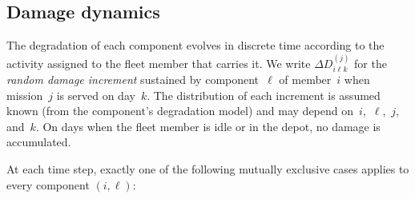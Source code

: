 \documentclass[11pt,a4paper]{article}
\theoremstyle{plain}
\theoremstyle{definition}
\theoremstyle{remark}
\begin{document}
\subsection{Damage dynamics}
\label{sec:damage_dynamics}

The degradation of each component evolves in discrete time according to the activity assigned to the fleet member that carries it.
We write $\Delta D_{i\ell k}^{(j)}$ for the \emph{random damage increment} sustained by component~$\ell$ of member~$i$ when mission~$j$ is served on day~$k$.
The distribution of each increment is assumed known (from the component's degradation model) and may depend on~$i$,~$\ell$,~$j$, and~$k$.
On days when the fleet member is idle or in the depot, no damage is accumulated.

At each time step, exactly one of the following mutually exclusive cases applies to every component $(i,\ell)$:
\end{document}
